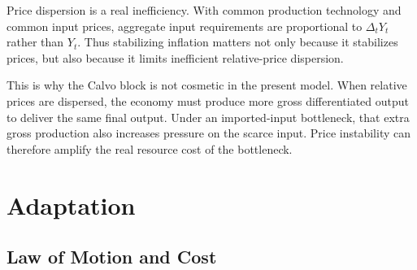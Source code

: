 ﻿\documentclass[12pt]{article}
\theoremstyle{remark}
\begin{document}
Price dispersion is a real inefficiency. With common production technology and common input prices,
aggregate input requirements are proportional to $\Delta_tY_t$ rather than $Y_t$. Thus stabilizing
inflation matters not only because it stabilizes prices, but also because it limits inefficient
relative-price dispersion.

This is why the Calvo block is not cosmetic in the present model. When relative prices are
dispersed, the economy must produce more gross differentiated output to deliver the same final
output. Under an imported-input bottleneck, that extra gross production also increases pressure on
the scarce input. Price instability can therefore amplify the real resource cost of the bottleneck.

\section{Adaptation}

\subsection{Law of Motion and Cost}
\end{document}
